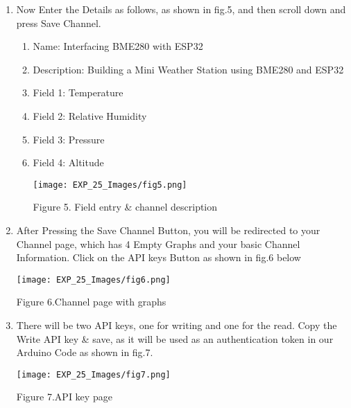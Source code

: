 \documentclass[12pt,a4paper]{article}
\begin{document}
\begin{justify}
\begin{enumerate}
\begin{center} 
\texttt{[image: EXP\_25\_Images/fig4.png]}
\end{center}
\vspace{-10mm}
\begin{center} {Figure 4. Channel creation}\end{center}


\item Now Enter the Details as follows, as shown in fig.5, and then scroll down and press Save Channel.
\begin{enumerate}
    \item Name: Interfacing BME280 with ESP32
\item Description: Building a Mini Weather Station using BME280 and ESP32
\item Field 1: Temperature
\item Field 2: Relative Humidity
\item Field 3: Pressure
\item Field 4: Altitude\\[6pt]
\begin{center} 
\texttt{[image: EXP\_25\_Images/fig5.png]}
\end{center}
\begin{center} {Figure 5. Field entry \& channel description}\end{center}
\end{enumerate}

\item After Pressing the Save Channel Button, you will be redirected to your Channel page, which has 4 Empty Graphs and your basic Channel Information. Click on the API keys Button as shown in fig.6 below

\begin{center} 
\texttt{[image: EXP\_25\_Images/fig6.png]}
\end{center}
\begin{center} {Figure 6.Channel page with graphs}\end{center}

\item There will be two API keys, one for writing and one for the read. Copy the Write API key \& save, as it will be used as an authentication token in our Arduino Code as shown in fig.7.

\begin{center} 
\texttt{[image: EXP\_25\_Images/fig7.png]}
\end{center}
\begin{center} {Figure 7.API key page }\end{center}
\end{enumerate}


\end{justify}
\end{document}
